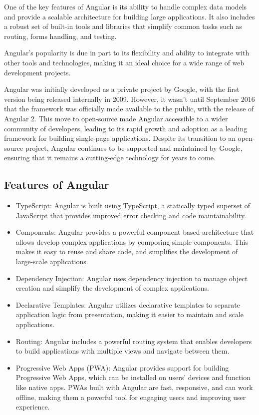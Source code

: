 \documentclass{article}
\begin{document}
    One of the key features of Angular is its ability to handle complex data models and provide a scalable architecture for building large applications. It also includes a robust set of built-in tools and libraries that simplify common tasks such as routing, forms handling, and testing.

    Angular's popularity is due in part to its flexibility and ability to integrate with other tools and technologies, making it an ideal choice for a wide range of web development projects. 

    Angular was initially developed as a private project by Google, with the first version being released internally in 2009. However, it wasn't until September 2016 that the framework was officially made available to the public, with the release of Angular 2. This move to open-source made Angular accessible to a wider community of developers, leading to its rapid growth and adoption as a leading framework for building single-page applications. Despite its transition to an open-source project, Angular continues to be supported and maintained by Google, ensuring that it remains a cutting-edge technology for years to come.

\subsection{Features of Angular}
    
\begin{itemize}

    \item TypeScript: Angular is built using TypeScript, a statically typed superset of JavaScript that provides improved error checking and code maintainability.
    \item Components: Angular provides a powerful component based architecture that allows develop complex applications by composing simple components. This makes it easy to reuse and share code, and simplifies the development of large-scale applications.
    \item Dependency Injection: Angular uses dependency injection to manage object creation and simplify the development of complex applications.
    \item Declarative Templates: Angular utilizes declarative templates to separate application logic from presentation, making it easier to maintain and scale applications.
    \item Routing: Angular includes a powerful routing system that enables developers to build applications with multiple views and navigate between them.
    \item Progressive Web Apps (PWA): Angular provides support for building Progressive Web Apps, which can be installed on users' devices and function like native apps. PWAs built with Angular are fast, responsive, and can work offline, making them a powerful tool for engaging users and improving user experience.


  \end{itemize}
  
\end{document}
